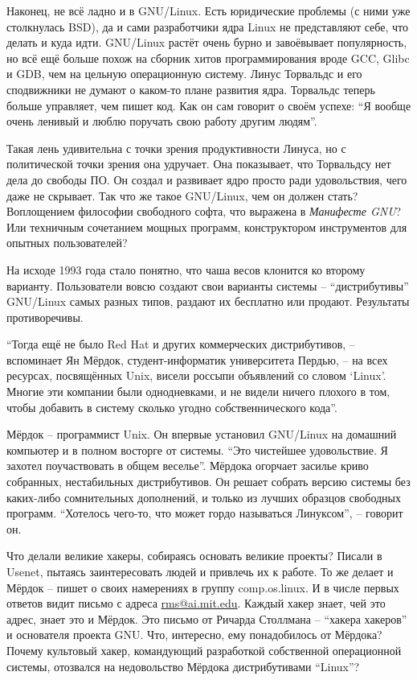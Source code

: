 Наконец, не всё ладно и в GNU/Linux. Есть юридические проблемы (с ними уже столкнулась BSD), да и сами разработчики ядра Linux не представляют себе, что делать и куда идти. GNU/Linux растёт очень бурно и завоёвывает популярность, но всё ещё больше похож на сборник хитов программирования вроде GCC, Glibc и GDB, чем на цельную операционную систему. Линус Торвальдс и его сподвижники не думают о каком-то плане развития ядра. Торвальдс теперь больше управляет, чем пишет код. Как он сам говорит о своём успехе: \enquote{Я вообще очень ленивый и люблю поручать свою работу другим людям}.

Такая лень удивительна с точки зрения продуктивности Линуса, но с политической точки зрения она удручает. Она показывает, что Торвальдсу нет дела до свободы ПО. Он создал и развивает ядро просто ради удовольствия, чего даже не скрывает. Так что же такое GNU/Linux, чем он должен стать? Воплощением философии свободного софта, что выражена в \textit{Манифесте GNU}? Или техничным сочетанием мощных программ, конструктором инструментов для опытных пользователей?

На исходе 1993 года стало понятно, что чаша весов клонится ко второму варианту. Пользователи вовсю создают свои варианты системы -- \enquote{дистрибутивы} GNU/Linux самых разных типов, раздают их бесплатно или продают. Результаты противоречивы.

\enquote{Тогда ещё не было Red Hat и других коммерческих дистрибутивов, -- вспоминает Ян Мёрдок, студент-информатик университета Пердью, -- на всех ресурсах, посвящённых Unix, висели россыпи объявлений со словом \enquote{Linux}. Многие эти компании были однодневками, и не видели ничего плохого в том, чтобы добавить в систему сколько угодно собственнического кода}.

Мёрдок -- программист Unix. Он впервые установил GNU/Linux на домашний компьютер и в полном восторге от системы. \enquote{Это чистейшее удовольствие. Я захотел поучаствовать в общем веселье}. Мёрдока огорчает засилье криво собранных, нестабильных дистрибутивов. Он решает собрать версию системы без каких-либо сомнительных дополнений, и только из лучших образцов свободных программ. \enquote{Хотелось чего-то, что может гордо называться Линуксом}, -- говорит он.

Что делали великие хакеры, собираясь основать великие проекты? Писали в Usenet, пытаясь заинтересовать людей и привлечь их к работе. То же делает и Мёрдок -- пишет о своих намерениях в группу comp.os.linux. И в числе первых ответов видит письмо с адреса \url{rms@ai.mit.edu}. Каждый хакер знает, чей это адрес, знает это и Мёрдок. Это письмо от Ричарда Столлмана -- \enquote{хакера хакеров} и основателя проекта GNU. Что, интересно, ему понадобилось от Мёрдока? Почему культовый хакер, командующий разработкой собственной операционной системы, отозвался на недовольство Мёрдока дистрибутивами \enquote{Linux}?

